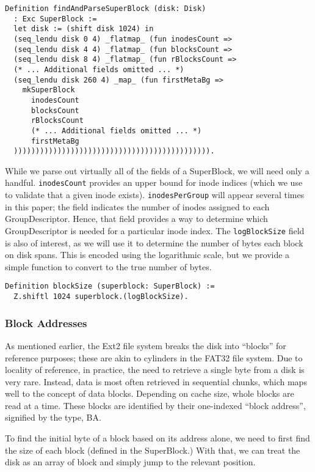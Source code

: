 \documentclass[nocopyrightspace]{sigplanconf}
\begin{document}
\begin{lstlisting}
Definition findAndParseSuperBlock (disk: Disk)
  : Exc SuperBlock :=
  let disk := (shift disk 1024) in
  (seq_lendu disk 0 4) _flatmap_ (fun inodesCount =>
  (seq_lendu disk 4 4) _flatmap_ (fun blocksCount =>
  (seq_lendu disk 8 4) _flatmap_ (fun rBlocksCount =>
  (* ... Additional fields omitted ... *)
  (seq_lendu disk 260 4) _map_ (fun firstMetaBg =>
    mkSuperBlock
      inodesCount
      blocksCount
      rBlocksCount
      (* ... Additional fields omitted ... *)
      firstMetaBg
  ))))))))))))))))))))))))))))))))))))))))))))).
\end{lstlisting}

While we parse out virtually all of the fields of a SuperBlock, we will need
only a handful. {\tt inodesCount} provides an upper bound for inode indices
(which we use to validate that a given inode exists). {\tt inodesPerGroup}
will appear several times in this paper; the field indicates the number of
inodes assigned to each GroupDescriptor. Hence, that field provides a way to
determine which GroupDescriptor is needed for a particular inode index. The
{\tt logBlockSize} field is also of interest, as we will use it to determine
the number of bytes each block on disk spans. This is encoded using the
logarithmic scale, but we provide a simple function to convert to the true
number of bytes.

\begin{lstlisting}
Definition blockSize (superblock: SuperBlock) := 
  Z.shiftl 1024 superblock.(logBlockSize).
\end{lstlisting}

\subsubsection{Block Addresses}

As mentioned earlier, the Ext2 file system breaks the disk into ``blocks'' for
reference purposes; these are akin to cylinders in the FAT32 file system. Due
to locality of reference, in practice, the need to retrieve a single byte from
a disk is very rare. Instead, data is most often retrieved in sequential
chunks, which maps well to the concept of data blocks.  Depending on cache
size, whole blocks are read at a time. These blocks are identified by their
one-indexed ``block address'', signified by the type, BA. 

To find the initial byte of a block based on its address alone, we need to
first find the size of each block (defined in the SuperBlock.) With that, we
can treat the disk as an array of block and simply jump to the relevant
position.
\end{document}
